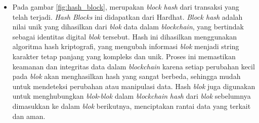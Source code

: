 \begin{itemize}
    \item Pada gambar \ref*{fig:hash_block}, merupakan \emph{block hash} dari transaksi yang telah terjadi. \emph{Hash Blocks} ini didapatkan dari Hardhat. \emph{Block hash} adalah nilai unik yang dihasilkan dari \emph{blok} data dalam \emph{blockchain}, yang bertindak sebagai identitas digital \emph{blok} tersebut. Hash ini dihasilkan menggunakan algoritma hash kriptografi, yang mengubah informasi \emph{blok} menjadi string karakter tetap panjang yang kompleks dan unik. Proses ini memastikan keamanan dan integritas data dalam \emph{blockchain} karena setiap perubahan kecil pada \emph{blok} akan menghasilkan hash yang sangat berbeda, sehingga mudah untuk mendeteksi perubahan atau manipulasi data. Hash \emph{blok} juga digunakan untuk menghubungkan \emph{blok}-\emph{blok} dalam \emph{blockchain} \emph{hash} dari \emph{blok} sebelumnya dimasukkan ke dalam \emph{blok} berikutnya, menciptakan rantai data yang terkait dan aman.
\end{itemize}

